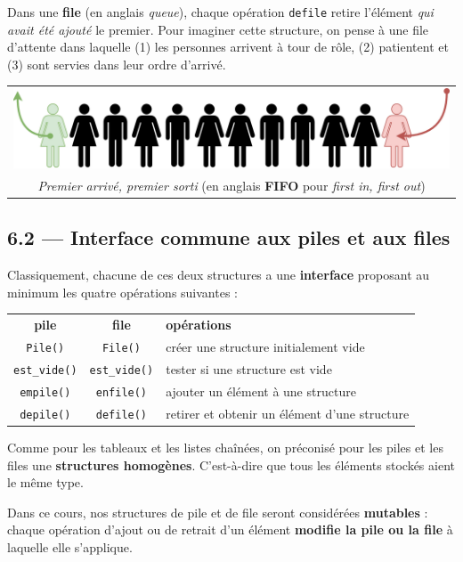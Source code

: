 \documentclass[a4paper,17pt]{extarticle}
\begin{document}
    Dans une \textbf{file} (en anglais \emph{queue}), chaque opération
\texttt{defile} retire l'élément \emph{qui avait été ajouté} le premier.
Pour imaginer cette structure, on pense à une file d'attente dans
laquelle (1) les personnes arrivent à tour de rôle, (2) patientent et
(3) sont servies dans leur ordre d'arrivé.

\begin{longtable}[]{@{}c@{}}
\toprule
\endhead
\includegraphics{img-file.png}\tabularnewline
\emph{Premier arrivé, premier sorti} (en anglais \textbf{FIFO} pour
\emph{first in, first out})\tabularnewline
\bottomrule
\end{longtable}

    \hypertarget{interface-commune-aux-piles-et-aux-files}{%
\subsection{6.2 --- Interface commune aux piles et aux
files}\label{interface-commune-aux-piles-et-aux-files}}

    Classiquement, chacune de ces deux structures a une \textbf{interface}
proposant au minimum les quatre opérations suivantes :

\begin{longtable}[]{@{}ccl@{}}
\toprule
\endhead
\textbf{pile} & \textbf{file} & \textbf{opérations}\tabularnewline
\texttt{Pile()} & \texttt{File()} & créer une structure initialement
vide\tabularnewline
\texttt{est\_vide()} & \texttt{est\_vide()} & tester si une structure
est vide\tabularnewline
\texttt{empile()} & \texttt{enfile()} & ajouter un élément à une
structure\tabularnewline
\texttt{depile()} & \texttt{defile()} & retirer et obtenir un élément
d'une structure\tabularnewline
\bottomrule
\end{longtable}

    Comme pour les tableaux et les listes chaînées, on préconisé pour les
piles et les files une \textbf{structures homogènes}. C'est-à-dire que
tous les éléments stockés aient le même type.

    Dans ce cours, nos structures de pile et de file seront considérées
\textbf{mutables} : chaque opération d'ajout ou de retrait d'un élément
\textbf{modifie la pile ou la file} à laquelle elle s'applique.
\end{document}
